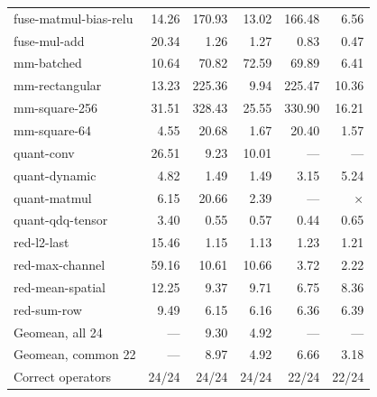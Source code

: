 \begin{table}[!htbp]
\begin{tabular*}{\textwidth}{@{\extracolsep{\fill}}lrrrrr@{}}
    fuse-matmul-bias-relu & 14.26 & 170.93 & 13.02 & 166.48 & 6.56 \\
    fuse-mul-add & 20.34 & 1.26 & 1.27 & 0.83 & 0.47 \\
    \midrule
    mm-batched & 10.64 & 70.82 & 72.59 & 69.89 & 6.41 \\
    mm-rectangular & 13.23 & 225.36 & 9.94 & 225.47 & 10.36 \\
    mm-square-256 & 31.51 & 328.43 & 25.55 & 330.90 & 16.21 \\
    mm-square-64 & 4.55 & 20.68 & 1.67 & 20.40 & 1.57 \\
    \midrule
    quant-conv & 26.51 & 9.23 & 10.01 & --- & --- \\
    quant-dynamic & 4.82 & 1.49 & 1.49 & 3.15 & 5.24 \\
    quant-matmul & 6.15 & 20.66 & 2.39 & --- & $\times$ \\
    quant-qdq-tensor & 3.40 & 0.55 & 0.57 & 0.44 & 0.65 \\
    \midrule
    red-l2-last & 15.46 & 1.15 & 1.13 & 1.23 & 1.21 \\
    red-max-channel & 59.16 & 10.61 & 10.66 & 3.72 & 2.22 \\
    red-mean-spatial & 12.25 & 9.37 & 9.71 & 6.75 & 8.36 \\
    red-sum-row & 9.49 & 6.15 & 6.16 & 6.36 & 6.39 \\
    \midrule
    Geomean, all 24 & --- & 9.30 & 4.92 & --- & --- \\
    Geomean, common 22 & --- & 8.97 & 4.92 & 6.66 & 3.18 \\
    Correct operators & 24/24 & 24/24 & 24/24 & 22/24 & 22/24 \\
    \bottomrule
  \end{tabular*}
\end{table}
